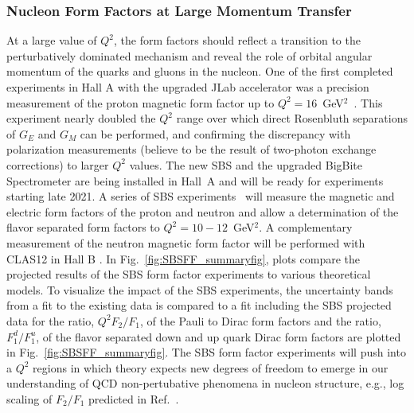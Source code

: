 \subsubsection*{Nucleon Form Factors at Large Momentum Transfer}

At a large value of $Q^2$, the form factors should reflect a transition to the perturbatively dominated mechanism and reveal the role of orbital angular momentum of the quarks and gluons in the nucleon. One of the first completed experiments in Hall A with the upgraded JLab accelerator was a precision measurement of the proton magnetic form factor up to $Q^2 = 16$~GeV$^2$~\cite{Christy:2021snt}. This experiment nearly doubled the $Q^2$ range over which direct Rosenbluth separations of $G_E$ and $G_M$ can be performed, and confirming the discrepancy with polarization measurements (believe to be the result of two-photon exchange corrections) to larger $Q^2$ values.
The new SBS and the upgraded BigBite Spectrometer are being installed in Hall~A and will be ready for experiments starting late 2021. 
A series of SBS experiments~\cite{GEP5_PAC47-short,GEN2-short,GMN-short,GENHC-short,GENRP-short,GENTPE-short} will measure the magnetic and electric form factors of the proton and neutron and allow a determination of the flavor separated form factors
to $Q^2 = 10-12$~GeV$^2$. A complementary measurement of the neutron magnetic form factor will be performed with CLAS12 in Hall B \cite{GMN-HallB-short}.
In Fig.~\ref{fig:SBSFF_summaryfig}, plots compare the projected results of the SBS form factor experiments to various theoretical models. To visualize the impact of the SBS experiments, the uncertainty bands from a fit to the existing data is compared to a fit including the SBS projected data for the ratio, $Q^2F_2/F_1$,  of the Pauli to Dirac form factors and the ratio, $F_1^d/F_1^u$, of the flavor separated down and up quark Dirac form factors are plotted in Fig.~\ref{fig:SBSFF_summaryfig}.
The SBS form factor experiments will push into a $Q^2$ regions in which theory expects new degrees of freedom to emerge in our understanding of QCD non-pertubative phenomena in nucleon structure, e.g., log scaling 
of $F_2/F_1$ predicted in Ref.~\cite{Belitsky:2002kj}.


